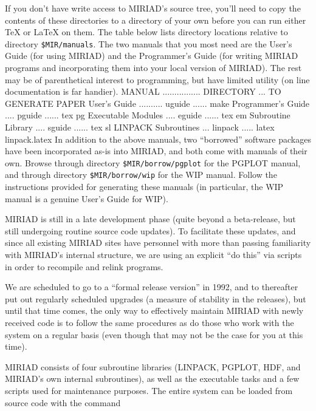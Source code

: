 If you don't have write access to MIRIAD's source tree, you'll need to copy
the contents of these directories to a directory of your own before you can
run either {\TeX } or {\LaTeX } on them.  The table below lists directory
locations relative to directory {\tt \$MIR/manuals}.  The two manuals that
you most need are the User's Guide (for using MIRIAD) and the Programmer's
Guide (for writing MIRIAD programs and incorporating them into your local
version of MIRIAD).  The rest may be of parenthetical interest to
programming, but have limited utility (on line documentation is far handier).
{\ninepoint\begintt
    MANUAL ................ DIRECTORY ... TO GENERATE PAPER
    User's Guide .......... uguide ...... make
    Programmer's Guide .... pguide ...... tex pg
    Executable Modules .... eguide ...... tex em
    Subroutine Library .... sguide ...... tex sl
    LINPACK Subroutines ... linpack ..... latex linpack.latex
\endtt}
In addition to the above manuals, two ``borrowed'' software packages have
been incorporated as-is into MIRIAD, and both come with manuals of their
own.  Browse through directory {\tt \$MIR/borrow/pgplot} for the PGPLOT
manual, and through directory {\tt \$MIR/borrow/wip} for the WIP manual.
Follow the instructions provided for generating these manuals (in particular,
the WIP manual is a genuine User's Guide for WIP).


MIRIAD is still in a late development phase (quite beyond a beta-release,
but still undergoing routine source code updates).  To facilitate these
updates, and since all existing MIRIAD sites have personnel with more than
passing familiarity with MIRIAD's internal structure, we are using an
explicit ``do this'' via scripts in order to recompile and relink programs.

We are scheduled to go to a ``formal release version'' in 1992, and to
thereafter put out regularly scheduled upgrades (a measure of stability in
the releases), but until that time comes, the only way to effectively
maintain MIRIAD with newly received code is to follow the same procedures
as do those who work with the system on a regular basis (even though that
may not be the case for you at this time).


MIRIAD consists of four subroutine libraries (LINPACK, PGPLOT, HDF, and
MIRIAD's own internal subroutines), as well as the executable tasks and
a few scripts used for maintenance purposes.  The entire system can be
loaded from source code with the command

